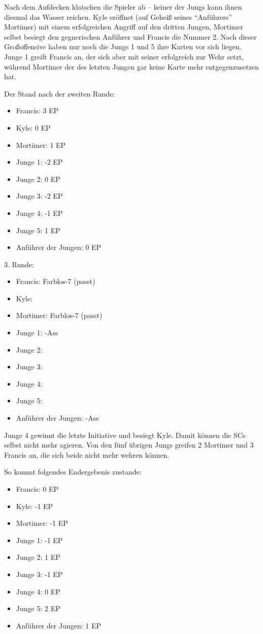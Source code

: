 Nach dem Aufdecken klatschen die Spieler ab -- keiner der Jungs kann ihnen diesmal das Wasser reichen. Kyle eröffnet (auf Geheiß seines "`Anführers"' Mortimer) mit einem erfolgreichen Angriff auf den dritten Jungen, Mortimer selbst besiegt den gegnerischen Anführer und Francis die Nummer 2. Nach dieser Großoffensive haben nur noch die Jungs 1 und 5 ihre Karten vor sich liegen. Junge 1 greift Francis an, der sich aber mit seiner  erfolgreich zur Wehr setzt, während Mortimer der  des letzten Jungen gar keine Karte mehr entgegenzusetzen hat.

Der Stand nach der zweiten Runde:
\begin {itemize}
\item Francis: 3 EP
\item Kyle: 0 EP
\item Mortimer: 1 EP
\item Junge 1: -2 EP
\item Junge 2: 0 EP
\item Junge 3: -2 EP
\item Junge 4: -1 EP
\item Junge 5: 1 EP
\item Anführer der Jungen: 0 EP
\end {itemize}

3. Runde:
\begin {itemize}
\item Francis: Farblos-7 (passt)
\item Kyle: 
\item Mortimer: Farblos-7 (passt)
\item Junge 1: \herz-Ass
\item Junge 2: 
\item Junge 3: 
\item Junge 4: 
\item Junge 5: 
\item Anführer der Jungen: \herz-Ass
\end {itemize}

Junge 4 gewinnt die letzte Initiative und besiegt Kyle. Damit können die SCs selbst nicht mehr agieren. Von den fünf übrigen Jungs greifen 2 Mortimer und 3 Francis an, die sich beide nicht mehr wehren können.

So kommt folgendes Endergebenis zustande:
\begin {itemize}
\item Francis: 0 EP
\item Kyle: -1 EP
\item Mortimer: -1 EP
\item Junge 1: -1 EP
\item Junge 2: 1 EP
\item Junge 3: -1 EP
\item Junge 4: 0 EP
\item Junge 5: 2 EP
\item Anführer der Jungen: 1 EP
\end {itemize}
\onecolumn
